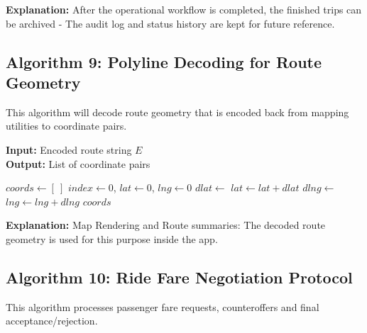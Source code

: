 \textbf{Explanation:} After the operational workflow is completed, the finished trips can be archived - The audit log and status history are kept for future reference.

\subsection{Algorithm 9: Polyline Decoding for Route Geometry}

This algorithm will decode route geometry that is encoded back from mapping utilities to coordinate pairs.

\begin{breakablealgorithm}
\small
\caption{Route Polyline Decoding}
\textbf{Input:} Encoded route string $E$ \\
\textbf{Output:} List of coordinate pairs
\begin{algorithmic}[1]
    \State $coords \gets [~]$
    \State $index \gets 0$, $lat \gets 0$, $lng \gets 0$
        \State $dlat \gets$ 
        \State $lat \gets lat + dlat$
        \State $dlng \gets$ 
        \State $lng \gets lng + dlng$
        \State {}
    \EndWhile
    \State \Return $coords$
\EndFunction
\end{algorithmic}
\end{breakablealgorithm}

\textbf{Explanation:} Map Rendering and Route summaries: The decoded route geometry is used for this purpose inside the app.

\subsection{Algorithm 10: Ride Fare Negotiation Protocol}

This algorithm processes passenger fare requests, counteroffers and final acceptance/rejection.

